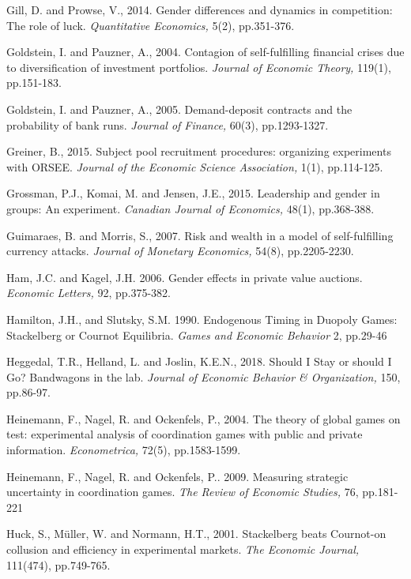 \documentclass[12pt,english]{article}
\begin{document}
\begin{thebibliography}{10}
  Gill, D. and Prowse, V., 2014. Gender differences and dynamics in competition: The role of luck. \textit{Quantitative Economics,} 5(2), pp.351-376.

\bibitem{} Goldstein, I. and Pauzner, A., 2004. Contagion of self-fulfilling financial crises due to diversification of investment portfolios. \textit{Journal of Economic Theory,} 119(1), pp.151-183.

\bibitem{} Goldstein, I. and Pauzner, A., 2005. Demand-deposit contracts and the probability of bank runs. \textit{Journal of Finance,} 60(3), pp.1293-1327.

\bibitem{} Greiner, B., 2015. Subject pool recruitment procedures: organizing experiments with ORSEE. \textit{Journal of the Economic Science Association,} 1(1), pp.114-125.

\bibitem{} Grossman, P.J., Komai, M. and Jensen, J.E., 2015. Leadership and gender in groups: An experiment. \textit{Canadian Journal of Economics,} 48(1), pp.368-388.

\bibitem{}  Guimaraes, B. and Morris, S., 2007. Risk and wealth in a model of self-fulfilling currency attacks. \textit{Journal of Monetary Economics,} 54(8), pp.2205-2230.

\bibitem{}  Ham, J.C. and Kagel, J.H. 2006. Gender effects in private value auctions. \textit{Economic Letters,} 92, pp.375-382.

\bibitem{} Hamilton, J.H., and Slutsky, S.M. 1990. Endogenous Timing in Duopoly Games: Stackelberg or Cournot Equilibria. \textit{Games and Economic Behavior} 2, pp.29-46

\bibitem{} Heggedal, T.R., Helland, L. and Joslin, K.E.N., 2018. Should I Stay or should I Go? Bandwagons in the lab. \textit{Journal of Economic Behavior \& Organization,} 150, pp.86-97.

\bibitem{}Heinemann, F., Nagel, R. and Ockenfels, P., 2004. The theory of global games on test: experimental analysis of coordination games with public and private information. \textit{Econometrica, } 72(5), pp.1583-1599.

\bibitem{} Heinemann, F., Nagel, R. and Ockenfels, P.. 2009. Measuring strategic uncertainty in coordination games. \textit{The Review of Economic Studies,}  76, pp.181-221

\bibitem{}Huck, S., M\"{u}ller, W. and Normann, H.T., 2001. Stackelberg beats Cournot-on collusion and efficiency in experimental markets. \textit{The Economic Journal,} 111(474), pp.749-765.


\end{thebibliography}
\end{document}
